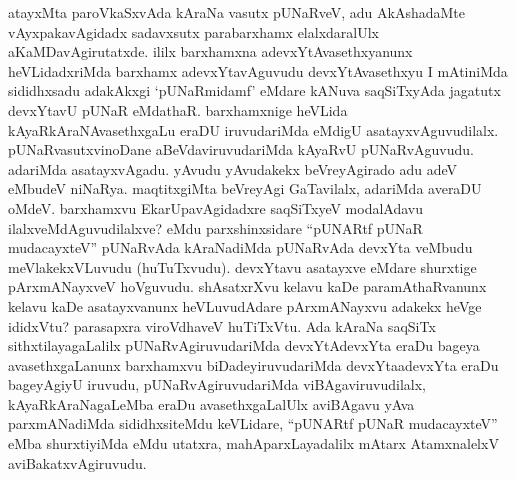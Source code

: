 \begin{artha}
atayxMta paroVkaSxvAda kAraNa vasutx pUNaRveV, adu AkAshadaMte vAyxpakavAgidadx sadavxsutx parabarxhamx elalxdaralUlx aKaMDavAgirutatxde. ililx barxhamxna adevxYtAvasethxyanunx heVLidadxriMda barxhamx adevxYtavAguvudu devxYtAvasethxyu I mAtiniMda sididhxsadu adakAkxgi `pUNaRmidamf' eMdare kANuva saqSiTxyAda jagatutx devxYtavU pUNaR eMdathaR. barxhamxnige heVLida kAyaRkAraNAvasethxgaLu eraDU iruvudariMda eMdigU asatayxvAguvudilalx. pUNaRvasutxvinoDane aBeVdaviruvudariMda kAyaRvU pUNaRvAguvudu. adariMda asatayxvAgadu. yAvudu yAvudakekx beVreyAgirado adu adeV eMbudeV niNaRya. maqtitxgiMta beVreyAgi GaTavilalx, adariMda averaDU oMdeV. barxhamxvu EkarUpavAgidadxre saqSiTxyeV modalAdavu ilalxveMdAguvudilalxve? eMdu parxshinxsidare ``pUNARtf pUNaR mudacayxteV'' pUNaRvAda kAraNadiMda pUNaRvAda devxYta veMbudu meVlakekxVLuvudu (huTuTxvudu). devxYtavu asatayxve eMdare shurxtige pArxmANayxveV hoVguvudu. shAsatxrXvu kelavu kaDe paramAthaRvanunx kelavu kaDe asatayxvanunx heVLuvudAdare pArxmANayxvu adakekx heVge ididxVtu? parasapxra viroVdhaveV huTiTxVtu. Ada kAraNa saqSiTx sithxtilayagaLalilx pUNaRvAgiruvudariMda devxYtAdevxYta eraDu bageya avasethxgaLanunx barxhamxvu biDadeyiruvudariMda devxYtaadevxYta eraDu bageyAgiyU iruvudu, pUNaRvAgiruvudariMda viBAgaviruvudilalx, kAyaRkAraNagaLeMba eraDu avasethxgaLalUlx aviBAgavu yAva parxmANadiMda sididhxsiteMdu keVLidare, ``pUNARtf pUNaR mudacayxteV'' eMba shurxtiyiMda eMdu utatxra, mahAparxLayadalilx mAtarx AtamxnalelxV aviBakatxvAgiruvudu.
\end{artha}

